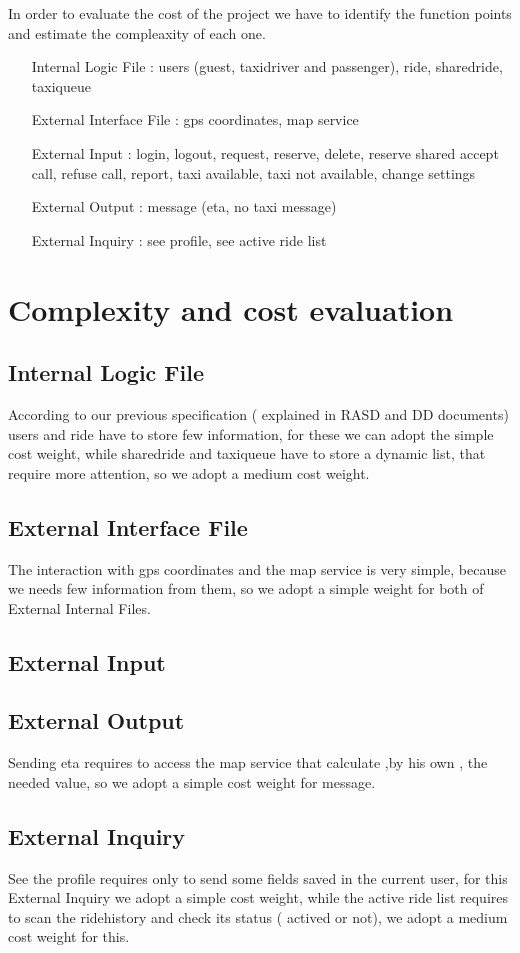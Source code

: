 In order to evaluate the cost of the project we have to identify 
the function points and estimate the compleaxity of each one.
\begin{itemize}
  \item [Internal Logic File]: users (guest, taxidriver and passenger), 
                               ride, sharedride, taxiqueue
  \item[External Interface File]: gps coordinates, map service
  \item[External Input]: login, logout, request, reserve, delete, reserve shared
                         accept call, refuse call, report, taxi available,
                         taxi not available, change settings
  \item[External Output]: message (eta, no taxi message)
  \item[External Inquiry]: see profile, see active ride list
\end{itemize}
\section{Complexity and cost evaluation}
  \subsection{ Internal Logic File}
  According to our previous specification ( explained in RASD and DD documents)
  users and ride have to store few information, for these we can adopt the
  simple cost weight, while sharedride and taxiqueue have to store a dynamic
  list, that require more attention, so we adopt a medium cost weight.
  \subsection{External Interface File}
  The interaction with gps coordinates and the map service is very simple, 
  because we needs few information from them, so we adopt a simple weight for
  both of External Internal Files.
  \subsection{External Input}
  \subsection{External Output}
  Sending eta requires to access the map service that calculate ,by his own ,
  the needed value, so we adopt a simple cost weight for message.
  \subsection{External Inquiry}
  See the profile requires only to send some fields saved in the current user,
  for this External Inquiry we adopt a simple cost weight, while the active
  ride list requires to scan the ridehistory and check its status ( actived or
  not), we adopt a medium cost weight for this.
